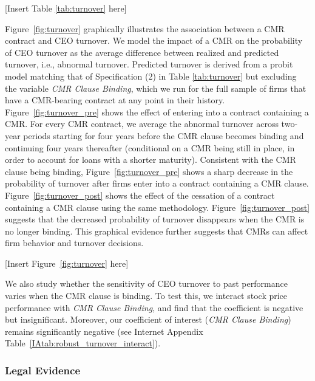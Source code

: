 \documentclass[a4paper,12pt]{article}
\begin{document}
\begin{center}
  [Insert Table \ref{tab:turnover} here]
\end{center}


Figure~\ref{fig:turnover} graphically illustrates the association between a CMR contract and CEO turnover.
We model the impact of a CMR on the probability of CEO turnover as the average difference between realized and predicted turnover, i.e., abnormal turnover.
Predicted turnover is derived from a probit model matching that of Specification (2) in Table \ref{tab:turnover} but excluding the variable \textit{CMR Clause Binding}, which we run for the full sample of firms that have a CMR-bearing contract at any point in their history.
Figure~\ref{fig:turnover_pre} shows the effect of entering into a contract containing a CMR.
For every CMR contract, we average the abnormal turnover across two-year periods starting for four years before the CMR clause becomes binding and continuing four years thereafter (conditional on a CMR being still in place, in order to account for loans with a shorter maturity).
Consistent with the CMR clause being binding, Figure~\ref{fig:turnover_pre} shows a sharp decrease in the probability of turnover after firms enter into a contract containing a CMR clause.
Figure~\ref{fig:turnover_post} shows the effect of the cessation of a contract containing a CMR clause using the same methodology.
Figure~\ref{fig:turnover_post} suggests that the decreased probability of turnover disappears when the CMR is no longer binding.
This graphical evidence further suggests that CMRs can affect firm behavior and turnover decisions.


\begin{center}
  [Insert Figure~\ref{fig:turnover} here]
\end{center}

We also study whether the sensitivity of CEO turnover to past performance varies when the CMR clause is binding.
To test this, we interact stock price performance with \textit{CMR Clause Binding}, and find that the coefficient is negative but insignificant.
Moreover, our coefficient of interest (\textit{CMR Clause Binding}) remains significantly negative (see Internet Appendix Table~\ref{IAtab:robust_turnover_interact}).


\subsubsection{Legal Evidence} \label{section:farah_case}
\end{document}
